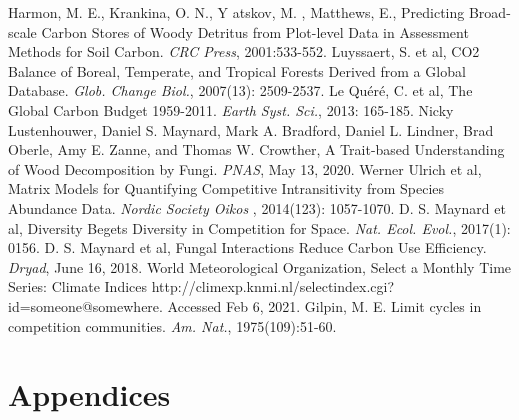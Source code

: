 \documentclass[12pt]{article}
\begin{document}
\clearpage
\begin{thebibliography}{99}
	
	Harmon, M. E., Krankina, O. N., Y atskov, M. , Matthews, E., Predicting Broad-scale Carbon Stores of Woody Detritus from Plot-level Data in Assessment Methods for Soil Carbon. \emph{CRC Press}, 2001:533-552.
	Luyssaert, S. et al, CO2 Balance of Boreal, Temperate, and Tropical Forests Derived from a Global Database. \emph{Glob. Change Biol.}, 2007(13): 2509-2537.
	Le Quéré, C. et al, The Global Carbon Budget 1959-2011. \emph{Earth Syst. Sci.}, 2013: 165-185.
	Nicky Lustenhouwer, Daniel S. Maynard, Mark A. Bradford, Daniel L. Lindner, Brad Oberle, 
	Amy E. Zanne, and Thomas W. Crowther, A Trait-based Understanding of Wood Decomposition by Fungi. \emph{PNAS}, May 13, 2020.
	Werner Ulrich et al, Matrix Models for Quantifying Competitive Intransitivity from Species Abundance Data. \emph{Nordic Society Oikos }, 2014(123): 1057-1070.
	D. S. Maynard et al, Diversity Begets Diversity in Competition for Space. \emph{Nat. Ecol. Evol.}, 2017(1): 0156.
	D. S. Maynard et al, Fungal Interactions Reduce Carbon Use Efficiency. \emph{Dryad}, June 16, 2018.
	World Meteorological Organization, Select a Monthly Time Series: Climate Indices http://climexp.knmi.nl/selectindex.cgi?id=someone@somewhere. Accessed Feb 6, 2021.
	Gilpin, M. E. Limit cycles in competition communities. \emph{Am. Nat.}, 1975(109):51-60.
\end{thebibliography}

\clearpage

\section*{Appendices}
\end{document}
